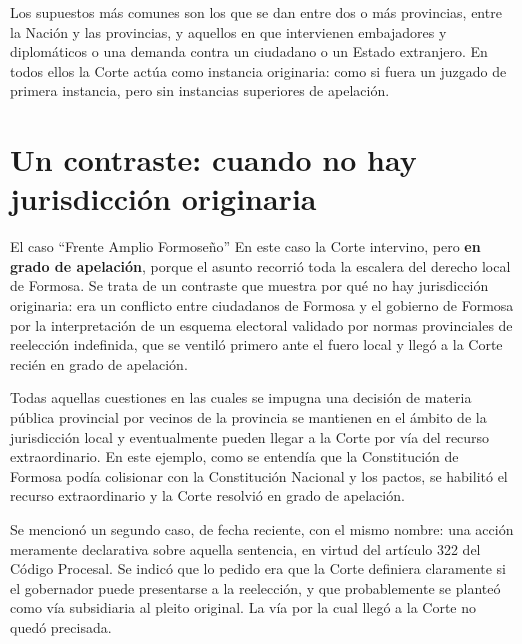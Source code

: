 \documentclass[12pt,oneside]{book}
\begin{document}
Los supuestos más comunes son los que se dan entre dos o más provincias, entre la Nación y las provincias, y aquellos en que intervienen embajadores y diplomáticos o una demanda contra un ciudadano o un Estado extranjero. En todos ellos la Corte actúa como instancia originaria: como si fuera un juzgado de primera instancia, pero sin instancias superiores de apelación.

\section{Un contraste: cuando no hay jurisdicción originaria}

\begin{example}{El caso ``Frente Amplio Formoseño''}
En este caso la Corte intervino, pero \textbf{en grado de apelación}, porque el asunto recorrió toda la escalera del derecho local de Formosa. Se trata de un contraste que muestra por qué no hay jurisdicción originaria: era un conflicto entre ciudadanos de Formosa y el gobierno de Formosa por la interpretación de un esquema electoral validado por normas provinciales de reelección indefinida, que se ventiló primero ante el fuero local y llegó a la Corte recién en grado de apelación.

Todas aquellas cuestiones en las cuales se impugna una decisión de materia pública provincial por vecinos de la provincia se mantienen en el ámbito de la jurisdicción local y eventualmente pueden llegar a la Corte por vía del recurso extraordinario. En este ejemplo, como se entendía que la Constitución de Formosa podía colisionar con la Constitución Nacional y los pactos, se habilitó el recurso extraordinario y la Corte resolvió en grado de apelación.
\end{example}

\begin{note}
Se mencionó un segundo caso, de fecha reciente, con el mismo nombre: una acción meramente declarativa sobre aquella sentencia, en virtud del artículo 322 del Código Procesal. Se indicó que lo pedido era que la Corte definiera claramente si el gobernador puede presentarse a la reelección, y que probablemente se planteó como vía subsidiaria al pleito original. La vía por la cual llegó a la Corte no quedó precisada.
\end{note}
\end{document}
